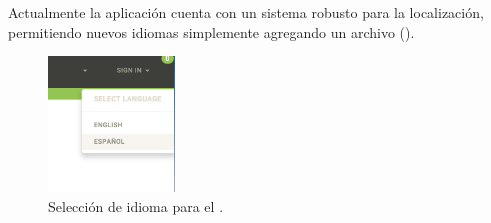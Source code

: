 Actualmente la aplicación cuenta con un sistema robusto para la localización, permitiendo nuevos idiomas simplemente agregando un archivo \jsonNAME ().


\begin{figure}[H]
	\centering
	\includegraphics[width=0.3\textwidth]{figuras/languages_available.png}

	\caption{Selección de idioma para el \websiteINT.}
	\label{figure:features:languages_available}
\end{figure}